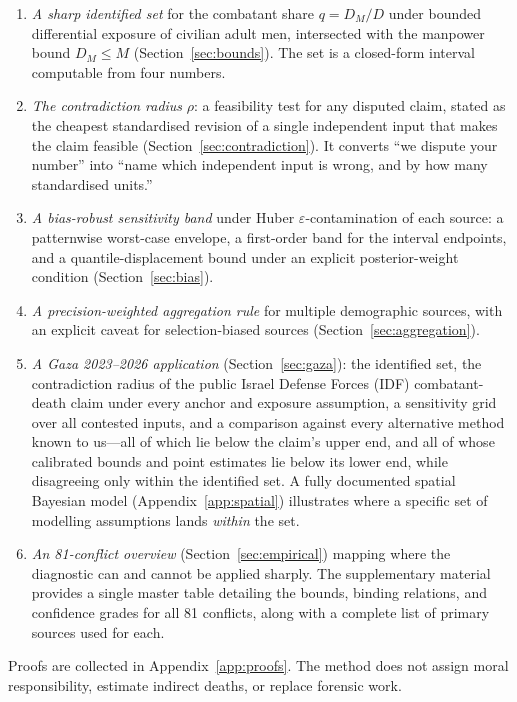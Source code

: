 \begin{enumerate}[leftmargin=*,label=(\roman*)]
\item \emph{A sharp identified set} for the combatant share $q=D_M/D$ under bounded differential exposure of civilian adult men, intersected with the manpower bound $D_M \le M$ (Section~\ref{sec:bounds}). The set is a closed-form interval computable from four numbers.
\item \emph{The contradiction radius} $\rho$: a feasibility test for any disputed claim, stated as the cheapest standardised revision of a single independent input that makes the claim feasible (Section~\ref{sec:contradiction}). It converts ``we dispute your number'' into ``name which independent input is wrong, and by how many standardised units.''
\item \emph{A bias-robust sensitivity band} under Huber $\varepsilon$-contamination of each source: a patternwise worst-case envelope, a first-order band for the interval endpoints, and a quantile-displacement bound under an explicit posterior-weight condition (Section~\ref{sec:bias}).
\item \emph{A precision-weighted aggregation rule} for multiple demographic sources, with an explicit caveat for selection-biased sources (Section~\ref{sec:aggregation}).
\item \emph{A Gaza 2023--2026 application} (Section~\ref{sec:gaza}): the identified set, the contradiction radius of the public Israel Defense Forces (IDF) combatant-death claim under every anchor and exposure assumption, a sensitivity grid over all contested inputs, and a comparison against every alternative method known to us---all of which lie below the claim's upper end, and all of whose calibrated bounds and point estimates lie below its lower end, while disagreeing only within the identified set. A fully documented spatial Bayesian model (Appendix~\ref{app:spatial}) illustrates where a specific set of modelling assumptions lands \emph{within} the set.
\item \emph{An 81-conflict overview} (Section~\ref{sec:empirical}) mapping where the diagnostic can and cannot be applied sharply. The supplementary material provides a single master table detailing the bounds, binding relations, and confidence grades for all 81 conflicts, along with a complete list of primary sources used for each.
\end{enumerate}

Proofs are collected in Appendix~\ref{app:proofs}. The method does not assign moral responsibility, estimate indirect deaths, or replace forensic work.
